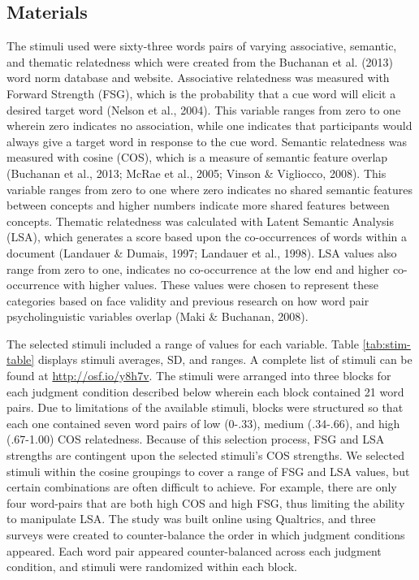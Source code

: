 \documentclass[english,man]{apa6}
\theoremstyle{definition}
\theoremstyle{definition}
\theoremstyle{definition}
\theoremstyle{remark}
\begin{document}
\subsection{Materials}\label{materials}

The stimuli used were sixty-three words pairs of varying associative,
semantic, and thematic relatedness which were created from the Buchanan
et al. (2013) word norm database and website. Associative relatedness
was measured with Forward Strength (FSG), which is the probability that
a cue word will elicit a desired target word (Nelson et al., 2004). This
variable ranges from zero to one wherein zero indicates no association,
while one indicates that participants would always give a target word in
response to the cue word. Semantic relatedness was measured with cosine
(COS), which is a measure of semantic feature overlap (Buchanan et al.,
2013; McRae et al., 2005; Vinson \& Vigliocco, 2008). This variable
ranges from zero to one where zero indicates no shared semantic features
between concepts and higher numbers indicate more shared features
between concepts. Thematic relatedness was calculated with Latent
Semantic Analysis (LSA), which generates a score based upon the
co-occurrences of words within a document (Landauer \& Dumais, 1997;
Landauer et al., 1998). LSA values also range from zero to one,
indicates no co-occurrence at the low end and higher co-occurrence with
higher values. These values were chosen to represent these categories
based on face validity and previous research on how word pair
psycholinguistic variables overlap (Maki \& Buchanan, 2008).

The selected stimuli included a range of values for each variable. Table
\ref{tab:stim-table} displays stimuli averages, SD, and ranges. A
complete list of stimuli can be found at \url{http://osf.io/y8h7v}. The
stimuli were arranged into three blocks for each judgment condition
described below wherein each block contained 21 word pairs. Due to
limitations of the available stimuli, blocks were structured so that
each one contained seven word pairs of low (0-.33), medium (.34-.66),
and high (.67-1.00) COS relatedness. Because of this selection process,
FSG and LSA strengths are contingent upon the selected stimuli's COS
strengths. We selected stimuli within the cosine groupings to cover a
range of FSG and LSA values, but certain combinations are often
difficult to achieve. For example, there are only four word-pairs that
are both high COS and high FSG, thus limiting the ability to manipulate
LSA. The study was built online using Qualtrics, and three surveys were
created to counter-balance the order in which judgment conditions
appeared. Each word pair appeared counter-balanced across each judgment
condition, and stimuli were randomized within each block.
\end{document}
